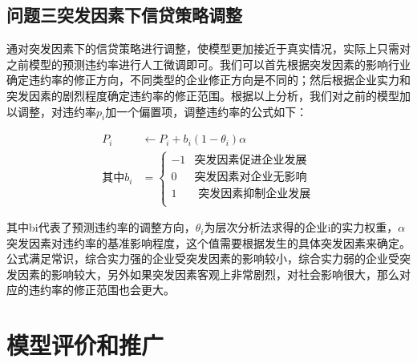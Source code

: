 \documentclass{cumcmthesis}
\begin{document}
\subsection{问题三突发因素下信贷策略调整}
通对突发因素下的信贷策略进行调整，使模型更加接近于真实情况，实际上只需对之前模型的预测违约率进行人工微调即可。我们可以首先根据突发因素的影响行业确定违约率的修正方向，不同类型的企业修正方向是不同的；然后根据企业实力和突发因素的剧烈程度确定违约率的修正范围。根据以上分析，我们对之前的模型加以调整，对违约率$p_i$加一个偏置项，调整违约率的公式如下：

\begin{equation}
    \begin{split}
         P_i &\gets  P_i + b_i \left(1-\theta_i \right) \alpha \\
        \mbox{其中} b_i & = 
        \begin{cases}
            -1 & \mbox{突发因素促进企业发展} \\
            0 & \mbox{突发因素对企业无影响} \\
            1 &\mbox{ 突发因素抑制企业发展} \\
        \end{cases}
    \end{split}
\end{equation}

其中bi代表了预测违约率的调整方向，$\theta_i$为层次分析法求得的企业i的实力权重，$\alpha$ 突发因素对违约率的基准影响程度，这个值需要根据发生的具体突发因素来确定。公式满足常识，综合实力强的企业受突发因素的影响较小，综合实力弱的企业受突发因素的影响较大，另外如果突发因素客观上非常剧烈，对社会影响很大，那么对应的违约率的修正范围也会更大。














\section{模型评价和推广}
\end{document}
